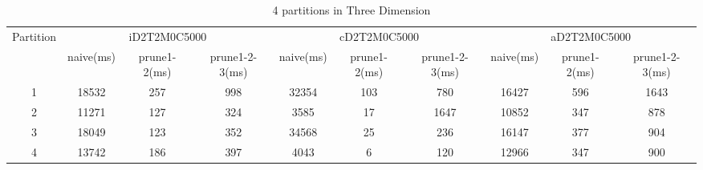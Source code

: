 \begin{table*}[t]
  \centering
\makeatletter
    \long{}
\makeatother
  \caption{4 partitions in Three Dimension}
    \vspace*{3pt}
  \footnotesize

  \label{table:partition4inThree}
  \begin{tabular}{|c||c|c|c|c|c|c|c|c|c|}
  \hline
  \multirow{2}{*}{Partition} &  \multicolumn{3}{|c|}{iD2T2M0C5000} & \multicolumn{3}{|c|}{cD2T2M0C5000} &\multicolumn{3}{|c|}{aD2T2M0C5000} \\\cline{2-10}
    &  naive(ms) & prune1-2(ms) & prune1-2-3(ms) & naive(ms) & prune1-2(ms) & prune1-2-3(ms) & naive(ms) & prune1-2(ms) & prune1-2-3(ms) \\\hline \hline

\cline{2-10}
    1 &  18532 & 257 & 998 & 32354 & 103 & 780 & 16427 & 596 & 1643 \\\hline

\cline{2-10}
    2 &  11271 & 127 & 324 & 3585 & 17 & 1647 & 10852 & 347 & 878 \\\hline

\cline{2-10}
    3 &  18049 & 123 & 352 & 34568 & 25 & 236 & 16147 & 377 & 904 \\\hline
    
\cline{2-10}
    4 &  13742 & 186 & 397 & 4043 & 6 & 120 & 12966 & 347 & 900 \\\hline
    
  \end{tabular}
  \vspace*{-17pt}
\end{table*}


